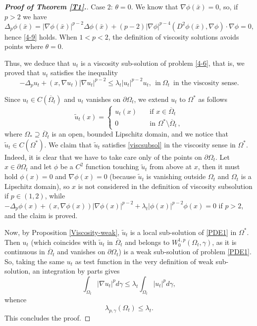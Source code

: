 \documentclass[12pt]{amsart}
\newcommand{\1}{\mathbf 1}
\begin{document}
\begin{proof}[\bf Proof of Theorem \ref{T1}.]
Case 2: $\theta= 0$. We know that $\nabla \phi (\bar{x})=0 $, so, if $p>2$ we have
\begin{equation}\nonumber
\Delta_p \phi(\bar{x})=|\nabla\phi(\bar{x})|^{p-2} \Delta \phi(\bar{x})+(p-2)|\nabla \phi|^{p-4}(D^2 \phi(\bar{x}),\nabla \phi)\cdot \nabla \phi=0,
\end{equation}
hence \eqref{4-9} holds. When $1<p<2$, the definition of viscosity solutions avoids points where $\theta=0$.

Thus, we deduce that $u_t$ is a viscosity sub-solution of problem \eqref{4-6}, that is, we proved that $u_t$ satisfies the inequality
\begin{equation}\label{viscsubsol}
-\Delta_p u_t+(x,\nabla u_t)|\nabla u_t|^{p-2}\leq \lambda_t |u_t|^{p-2}u_t,\ \  \mathrm{ in}\ \Omega_t\,\text{ in the viscosity sense}.
\end{equation}


Since $u_t\in C(\overline{\Omega}_t)$ and $u_t$ vanishes on $\partial \Omega_t$, we extend $u_t$ to $\Omega^{*}$ as follows
$$
\tilde{u}_t(x)=\left\{\begin{array}{ll}
u_t(x)\quad&\text{if }x\in\overline\Omega_t\\
0\quad&\text{in } \Omega^*\setminus{\overline\Omega}_t\,,
\end{array}\right.
$$
where $\Omega_{*}\supseteq \overline\Omega_t$ is an open, bounded Lipschitz domain, and we notice that $\tilde{u}_t\in C(\Omega^{*})$.
We claim that $\tilde{u}_t$ satisfies \eqref{viscsubsol} in the viscosity sense in $\Omega^*$.
Indeed, it is clear that we have to take care only of the points on $\partial\Omega_t$. Let $x\in\partial\Omega_t$ and let $\phi$ be a $C^2$ function touching $\tilde{u}_t$ from above at $x$, then it must hold $\phi(x)=0$ and $\nabla\phi(x)=0$ (because $\tilde{u}_t$ is vanishing outside $\Omega_t$ and  $\Omega_t$ is a Lipschitz domain), so $x$ is not considered in the definition of viscosity subsolution if $p\in(1,2)$, while
$-\Delta_p \phi(x)+(x,\nabla \phi(x))|\nabla \phi(x)|^{p-2}+\lambda_t |\phi(x)|^{p-2}\phi(x)=0$ if $p>2$, and the claim is proved.

Now, by Proposition \ref{Viscosity-weak}, $\tilde{u}_t$ is a local sub-solution of \eqref{PDE1} in $\Omega^*$. Then $u_t$ (which coincides with $\tilde u_t$ in $\overline\Omega_t$ and belongs to $W_0^{1,p}(\Omega_t,\gamma)$, as it is continuous in $\overline\Omega_t$ and vanishes on $\partial\Omega_t$) is a weak sub-solution of problem \eqref{PDE1}. So, taking the same $u_t$ as test function in the very definition of weak sub-solution, an integration by parts gives
\[
\int_{\Omega_t} |\nabla {u}_t|^{p} d\gamma \leq \lambda_t \int_{\Omega_t} |{u}_t|^{p} d\gamma,
\]
whence
\begin{equation}\nonumber
\lambda_{p,\gamma}(\Omega_t)\leq \lambda_t.
\end{equation}
This concludes the proof.
\end{proof}
\end{document}
